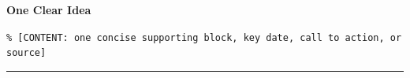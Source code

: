 \documentclass{article}
\begin{document}
\vspace*{25mm}
{\fontsize{56}{62}\selectfont\bfseries One Clear Idea\par}
\vfill
{\fontsize{18}{24}\selectfont\texttt{\% [CONTENT: one concise supporting block, key date, call to action, or source]}\par}
\vspace{15mm}\hrule
\end{document}
